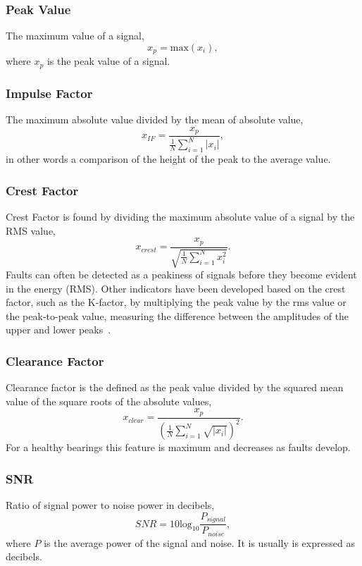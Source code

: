 \documentclass[]{article}
\begin{document}
\subsubsection*{Peak Value}
The maximum value of a signal,
\begin{equation}
x_p = \textrm{max}(x_i),
\end{equation}
where $x_p$ is the peak value of a signal.
\subsubsection*{Impulse Factor} 
The maximum absolute value divided by the mean of absolute value,
\begin{equation}
x_{IF} = \frac{x_p}{\frac{1}{N}\sum^N_{i=1}|x_i|},
\end{equation}
in other words a comparison of the height of the peak to the average value.
\subsubsection*{Crest Factor} 
Crest Factor is found by dividing the maximum absolute value of a signal by the \gls{RMS} value,
\begin{equation}
x_{crest} = \frac{x_p}{\sqrt{\frac{1}{N}\sum^N_{i=1}x^2_i}}.
\end{equation}
Faults can often be detected as a peakiness of signals before they become evident in the energy (\gls{RMS}). Other indicators have been developed based on the crest factor, such as the K-factor, by multiplying the peak value by the rms value or the peak-to-peak value, measuring the difference between the amplitudes of the upper and lower peaks~\cite{soualhi2021novel}.
\subsubsection*{Clearance Factor} 
Clearance factor is the defined as the peak value divided by the squared mean value of the square roots of the absolute values,
\begin{equation}
x_{clear} = \frac{x_p}{(\frac{1}{N}\sum^N_{i=1}\sqrt{|x_i|})^2}.
\end{equation}
For a healthy bearings this feature is maximum and decreases as faults develop.
\subsubsection*{\gls{SNR}}
Ratio of signal power to noise power in decibels,
\begin{equation}
	SNR = 10 \textrm{log}_{10} \frac{P_{signal}}{P_{noise}},
\end{equation}
where $P$ is the average power of the signal and noise. It is usually is expressed as decibels.
\end{document}
